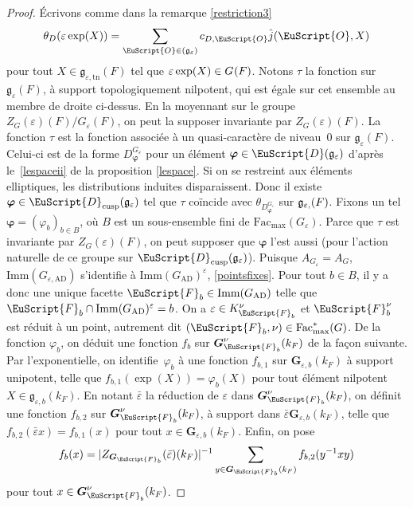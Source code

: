 \documentclass[JEP,XML,SOM,Unicode,francais]{cedram}
\let\mathcal \EuScript
\newcommand{\NoChangel}[1]{%
\expandafter\let\csname old\string#1\endcsname=#1
\let#1=\relax
\newcommand{#1}{\mathcode`l="716C\csname old\string#1\endcsname\mathcode`l="7160 }%
}
\let\epsilon\varepsilon
\newcommand{\frg}{\mathfrak{g}}
\newcommand{\AD}{\mathrm{AD}}
\newcommand{\cusp}{\mathrm{cusp}}
\newcommand{\rell}{\mathrm{ell}} \NoChangel{\rell}
\newcommand{\Fac}{\mathrm{Fac}}
\newcommand{\Imm}{\mathrm{Imm}}
\newcommand{\Nil}{\mathrm{Nil}} \NoChangel{\Nil}
\newcommand{\tn}{\mathrm{tn}}
\newcommand{\bG}{\boldsymbol{G}}
\newcommand{\cD}{\mathcal{D}}
\newcommand{\cF}{\mathcal{F}}
\newcommand{\cO}{\mathcal{O}}
\theoremstyle{plain}
\theoremstyle{definition}
\begin{document}
\begin{proof}
Écrivons comme dans la remarque \eqref{restriction3}
\[
\theta_{D}(\epsilon \exp(X))=\sum_{\cO\in \Nil(\frg_{\epsilon})}c_{D,\cO}\hat{j}(\cO,X)
\]
pour tout $X\in \frg_{\epsilon,\tn}(F)$ tel que $\epsilon \exp(X)\in G_{\rell}(F)$.
Notons $\tau$ la fonction sur $\frg_{\epsilon}(F)$, à support topologiquement nilpotent, qui est égale sur cet ensemble au membre de droite ci-dessus. En la moyennant sur le groupe $Z_{G}(\epsilon)(F)/G_{\epsilon}(F)$, on peut la supposer invariante par $Z_{G}(\epsilon)(F)$. La fonction $\tau$ est
la fonction associée à un quasi-caractère de niveau~$0$ sur $\frg_{\epsilon}(F)$. Celui-ci est de la forme $D^{G_{\epsilon}}_{\boldsymbol{\varphi}}$ pour un élément $\boldsymbol{\varphi}\in \cD(\frg_{\epsilon})$ d'après le~\eqref{lespaceii} de la proposition \ref{lespace}. Si on se restreint aux éléments elliptiques, les distributions induites disparaissent. Donc il existe $\boldsymbol{\varphi}\in \cD_{\cusp}(\frg_{\epsilon})$ tel que $\tau$ coïncide avec $\theta_{D^{G_{\epsilon}}_{\boldsymbol{\varphi}}}$ sur $\frg_{\epsilon,\rell}(F)$. Fixons un tel $\boldsymbol{\varphi}=(\varphi_{b})_{b\in B}$, où $B$ est un sous-ensemble fini de $\Fac_{\max}(G_{\epsilon})$. Parce que $\tau$ est invariante par $Z_{G}(\epsilon)(F)$, on peut supposer que $\boldsymbol{\varphi}$ l'est aussi (pour l'action naturelle de ce groupe sur $\cD_{\cusp}(\frg_{\epsilon})$).
Puisque $A_{G_{\epsilon}}=A_{G}$, $\Imm(G_{\epsilon,\AD})$ s'identifie à $\Imm(G_{\AD})^{\epsilon}$, \cf \ref{pointsfixes}. Pour tout $b\in B$, il y a donc une unique facette $\cF_{b}\in \Imm(G_{\AD})$ telle que $\cF_{b}\cap \Imm(G_{\AD})^{\epsilon}=b$. On a $\epsilon\in K_{\cF_{b}}^{\nu}$ et $\cF_{b}^{\nu}$ est réduit à un point, autrement dit $(\cF_{b},\nu)\in \Fac^*_{\max}(G)$. De la fonction $\varphi_{b}$, on déduit une fonction $f_{b}$ sur $\bG_{\cF_{b}}^{\nu}(k_{F})$ de la façon suivante. Par l'exponentielle, on identifie~$\varphi_{b}$ à une fonction $f_{b,1}$ sur $\bG_{\epsilon,b}(k_{F})$ à support unipotent, telle que $f_{b,1}(\exp(X))=\varphi_{b}(X)$ pour tout élément nilpotent $X\in \boldsymbol{\frg}_{\epsilon,b}(k_{F})$. En notant $\bar{\epsilon}$ la réduction de $\epsilon$ dans $\bG_{\cF_{b}}^{\nu}(k_{F})$, on définit une fonction $f_{b,2}$ sur $\bG_{\cF_{b}}^{\nu}(k_{F})$, à support dans $\bar{\epsilon}\bG_{\epsilon,b}(k_{F})$, telle que $f_{b,2}(\bar{\epsilon}x)=f_{b,1}(x)$ pour tout $x\in \bG_{\epsilon,b}(k_{F})$. Enfin, on pose
\[
f_{b}(x)=\vert Z_{\bG_{\cF_{b}}}(\bar{\epsilon})(k_{F})\vert ^{-1}
\sum_{y\in \bG_{\cF_{b}}(k_{F})}f_{b,2}(y^{-1}xy)
\]
pour tout $x\in \bG_{\cF_{b}}^{\nu}(k_{F})$.


\end{proof}
\end{document}
